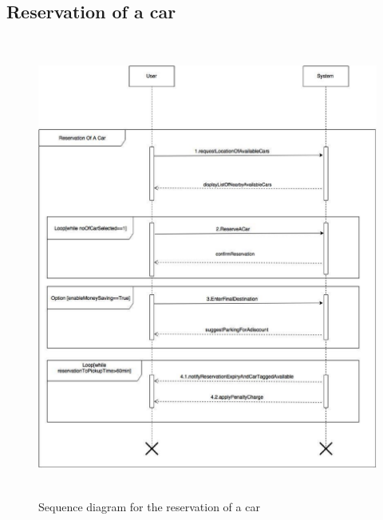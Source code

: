 \newpage
\subsection{Reservation of a car}
\begin{figure}[h]
\centering
\includegraphics[height=15.2cm,keepaspectratio]{figures/sequence_reservation.eps}
\caption{Sequence diagram for the reservation of a car}
\label{fig:sequence_reservation}
\end{figure}

\newpage
